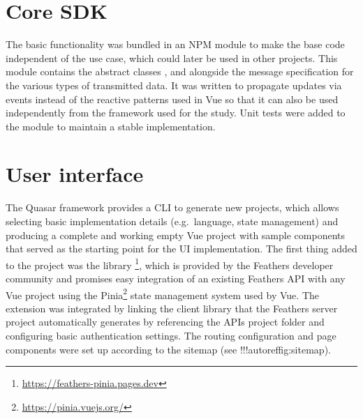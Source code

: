 \section{Core SDK}
\label{sec:core-sdk}

The basic functionality was bundled in an \ac{NPM} module to make the base code independent of the use case, which could later be used in other projects.
This module contains the abstract classes ,  and  alongside the message specification for the various types of transmitted data.
It was written to propagate updates via events instead of the reactive patterns used in Vue so that it can also be used independently from the framework used for the study.
Unit tests were added to the module to maintain a stable implementation.

\section{User interface}
\label{sec:user-interface}

The Quasar framework provides a \ac{CLI} to generate new projects, which allows selecting basic implementation details (e.g.\ language, state management) and producing a complete and working empty Vue project with sample components that served as the starting point for the \ac{UI} implementation.
The first thing added to the project was the library \footnote{\url{https://feathers-pinia.pages.dev}}, which is provided by the Feathers developer community and promises easy integration of an existing Feathers \ac{API} with any Vue project using the Pinia\footnote{\url{https://pinia.vuejs.org/}} state management system used by Vue.
The extension was integrated by linking the client library that the Feathers server project automatically generates by referencing the \ac{API}\textquotesingle s project folder and configuring basic authentication settings.
The routing configuration and page components were set up according to the sitemap (see !!!autoref{fig:sitemap}).

